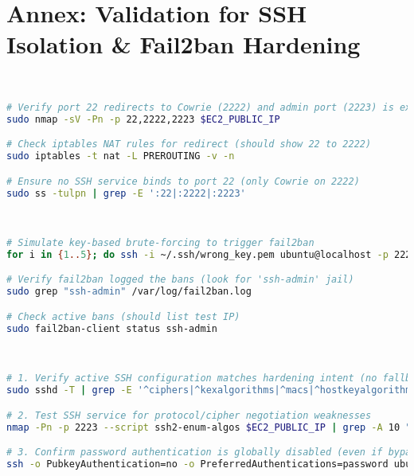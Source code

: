 \newpage

\section{Annex: Validation for SSH Isolation \& Fail2ban Hardening}  
\label{annex:network}
\
\
\begin{lstlisting}[language=bash, label={annexes:network}, caption={Network Isolation Verification}]  
# Verify port 22 redirects to Cowrie (2222) and admin port (2223) is exclusive  
sudo nmap -sV -Pn -p 22,2222,2223 $EC2_PUBLIC_IP  

# Check iptables NAT rules for redirect (should show 22 to 2222)  
sudo iptables -t nat -L PREROUTING -v -n  

# Ensure no SSH service binds to port 22 (only Cowrie on 2222)  
sudo ss -tulpn | grep -E ':22|:2222|:2223'  
\end{lstlisting}  
\


\begin{lstlisting}[language=bash, label={annexes:fail2ban}, caption={Fail2ban Efficacy Testing}]  
# Simulate key-based brute-forcing to trigger fail2ban  
for i in {1..5}; do ssh -i ~/.ssh/wrong_key.pem ubuntu@localhost -p 2223; done  

# Verify fail2ban logged the bans (look for 'ssh-admin' jail)  
sudo grep "ssh-admin" /var/log/fail2ban.log  

# Check active bans (should list test IP)  
sudo fail2ban-client status ssh-admin  
\end{lstlisting}  
\


\begin{lstlisting}[language=bash, label={annexes:ssh-hardening}, caption={SSH Service Hardening Validation}]  
# 1. Verify active SSH configuration matches hardening intent (no fallback to weak protocols)  
sudo sshd -T | grep -E '^ciphers|^kexalgorithms|^macs|^hostkeyalgorithms'  

# 2. Test SSH service for protocol/cipher negotiation weaknesses  
nmap -Pn -p 2223 --script ssh2-enum-algos $EC2_PUBLIC_IP | grep -A 10 "algorithm negotiation"  

# 3. Confirm password authentication is globally disabled (even if bypass attempted)  
ssh -o PubkeyAuthentication=no -o PreferredAuthentications=password ubuntu@$EC2_PUBLIC_IP -p 2223  
\end{lstlisting}  
\





